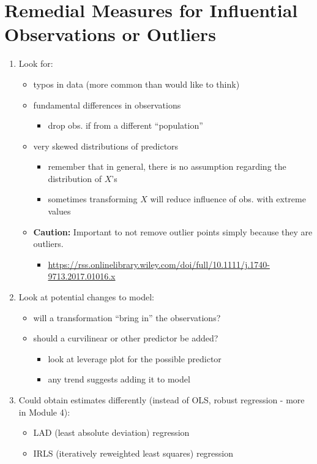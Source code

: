 \documentclass[12pt]{../notes}
\begin{document}
\section{Remedial Measures for Influential Observations or Outliers}

\begin{enumerate}
 \item Look for:
    \begin{itemize}
       \item  typos in data (more common than would like to think)
       \item fundamental differences in observations
          \begin{itemize}
            \item drop obs. if from a different ``population''
          \end{itemize}
       \item very skewed distributions of predictors
         \begin{itemize}
             \item remember that in general, there is no assumption regarding the distribution of $X$'s
             \item sometimes transforming $X$ will reduce influence of obs. with extreme values
         \end{itemize}
         \item \textbf{Caution:} Important to not remove outlier points simply because they are outliers. 
         \begin{itemize}
         \item \url{https://rss.onlinelibrary.wiley.com/doi/full/10.1111/j.1740-9713.2017.01016.x}
         \end{itemize}
    \end{itemize}

 \item Look at potential changes to model:
  \begin{itemize}
    \item will a transformation ``bring in'' the observations?
    \item should a curvilinear or other predictor be added?
       \begin{itemize}
         \item look at leverage plot for the possible predictor
         \item any trend suggests adding it to model
       \end{itemize}
  \end{itemize}

 \item Could obtain estimates differently (instead of OLS, robust regression - more in Module 4):
     \begin{itemize}
        \item LAD (least absolute deviation) regression
        \item IRLS (iteratively reweighted least squares) regression
     \end{itemize}
\end{enumerate}








\end{document}
